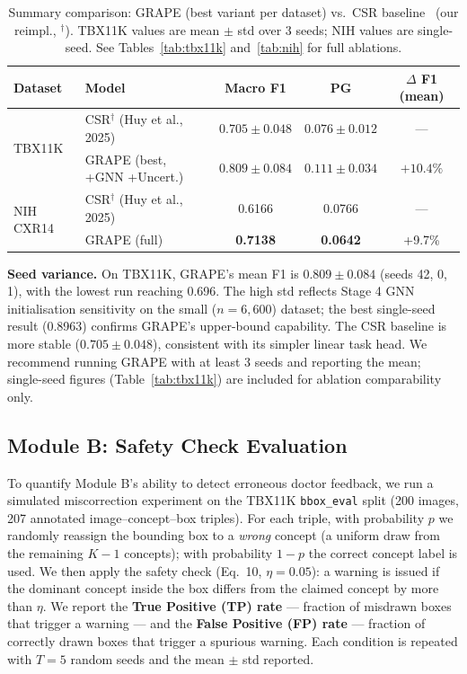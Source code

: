 \documentclass{article}
\begin{document}
\begin{table}[t]
  \caption{Summary comparison: GRAPE (best variant per dataset) vs.\ CSR baseline~\cite{csr2025} (our reimpl., $^\dagger$).
  TBX11K values are mean $\pm$ std over 3 seeds; NIH values are single-seed.
  See Tables~\ref{tab:tbx11k} and~\ref{tab:nih} for full ablations.}
  \label{tab:compare}
  \centering
  \begin{tabular}{llccc}
    \toprule
    Dataset & Model & Macro F1 & PG & $\Delta$ F1 (mean) \\
    \midrule
    \multirow{2}{*}{TBX11K} & CSR$^\dagger$ (Huy et al., 2025) & $0.705 \pm 0.048$ & $0.076 \pm 0.012$ & — \\
                             & GRAPE (best, +GNN +Uncert.)      & $\mathbf{0.809 \pm 0.084}$ & $\mathbf{0.111 \pm 0.034}$ & $+10.4\%$ \\
    \midrule
    \multirow{2}{*}{NIH CXR14} & CSR$^\dagger$ (Huy et al., 2025) & 0.6166 & 0.0766 & — \\
                                & GRAPE (full)                     & \textbf{0.7138} & \textbf{0.0642} & +9.7\% \\
    \bottomrule
  \end{tabular}
\end{table}

\noindent\textbf{Seed variance.}
On TBX11K, GRAPE's mean F1 is $0.809 \pm 0.084$ (seeds 42, 0, 1), with the lowest run reaching 0.696.
The high std reflects Stage 4 GNN initialisation sensitivity on the small ($n=6{,}600$) dataset; the best single-seed result (0.8963) confirms GRAPE's upper-bound capability.
The CSR baseline is more stable ($0.705 \pm 0.048$), consistent with its simpler linear task head.
We recommend running GRAPE with at least 3 seeds and reporting the mean; single-seed figures (Table~\ref{tab:tbx11k}) are included for ablation comparability only.

\subsection{Module B: Safety Check Evaluation}
\label{sec:safety_eval}

To quantify Module B's ability to detect erroneous doctor feedback, we run a simulated miscorrection experiment on the TBX11K \texttt{bbox\_eval} split (200 images, 207 annotated image--concept--box triples).
For each triple, with probability $p$ we randomly reassign the bounding box to a \emph{wrong} concept (a uniform draw from the remaining $K-1$ concepts); with probability $1-p$ the correct concept label is used.
We then apply the safety check (Eq.~10, $\eta = 0.05$): a warning is issued if the dominant concept inside the box differs from the claimed concept by more than $\eta$.
We report the \textbf{True Positive (TP) rate} — fraction of misdrawn boxes that trigger a warning — and the \textbf{False Positive (FP) rate} — fraction of correctly drawn boxes that trigger a spurious warning.
Each condition is repeated with $T=5$ random seeds and the mean $\pm$ std reported.
\end{document}
